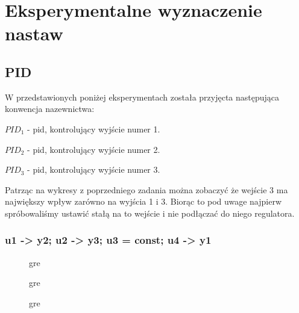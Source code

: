 \chapter{Eksperymentalne wyznaczenie nastaw}

\section{PID}
W przedstawionych poniżej eksperymentach została przyjęcta następująca konwencja nazewnictwa:

$PID_1$ - pid, kontrolujący wyjście numer 1.

\smallskip

$PID_2$ - pid, kontrolujący wyjście numer 2.

\smallskip

$PID_3$ - pid, kontrolujący wyjście numer 3.

\smallskip

Patrząc na wykresy z poprzedniego zadania można zobaczyć że wejście 3 ma największy wpływ zarówno na wyjścia 1 i 3. Biorąc to pod uwage najpierw spróbowaliśmy ustawić stałą na to wejście i nie podłączać do niego regulatora.

\subsection{u1 -> y2; u2 -> y3; u3 = const; u4 -> y1}

\begin{figure}[H]
    \centering
    
    \caption{gre}
\end{figure}

\begin{figure}[H]
    \centering
    
    \caption{gre}
\end{figure}

\begin{figure}[H]
    \centering
    
    \caption{gre}
\end{figure}

